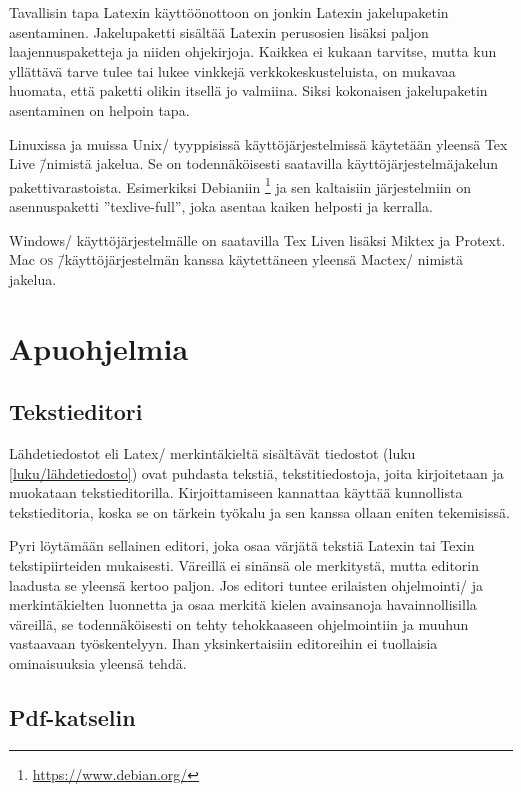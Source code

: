 Tavallisin tapa Latexin käyttöönottoon on jonkin Latexin jakelupaketin
asentaminen. Jakelupaketti sisältää Latexin perusosien lisäksi paljon
laajennuspaketteja ja niiden ohjekirjoja. Kaikkea ei kukaan tarvitse,
mutta kun yllättävä tarve tulee tai lukee vinkkejä verkkokeskusteluista,
on mukavaa huomata, että paketti olikin itsellä jo valmiina. Siksi
kokonaisen jakelupaketin asentaminen on helpoin tapa.

Linuxissa ja muissa Unix\-/ tyyppisissä käyttöjärjestelmissä käytetään
yleensä Tex Live \=/nimistä jakelua. Se on todennäköisesti saatavilla
käyttöjärjestelmäjakelun pakettivarastoista. Esimerkiksi Debianiin%
\footnote{\url{https://www.debian.org/}} ja sen kaltaisiin järjestelmiin
on asennuspaketti ''texlive-full'', joka asentaa kaiken helposti ja
kerralla.

Windows\-/ käyttöjärjestelmälle on saatavilla Tex Liven lisäksi Miktex
ja Protext. Mac \textsc{os} \=/käyttöjärjestelmän kanssa käytettäneen
yleensä Mactex\-/ nimistä jakelua.

\section{Apuohjelmia}

\subsection{Tekstieditori}

Lähdetiedostot eli Latex\-/ merkintäkieltä sisältävät tiedostot (luku
\ref{luku/lähdetiedosto}) ovat puhdasta tekstiä, tekstitiedostoja, joita
kirjoitetaan ja muokataan tekstieditorilla. Kirjoittamiseen kannattaa
käyttää kunnollista tekstieditoria, koska se on tärkein työkalu ja sen
kanssa ollaan eniten tekemisissä.

Pyri löytämään sellainen editori, joka osaa värjätä tekstiä Latexin tai
Texin tekstipiirteiden mukaisesti. Väreillä ei sinänsä ole merkitystä,
mutta editorin laadusta se yleensä kertoo paljon. Jos editori tuntee
erilaisten ohjelmointi\-/{} ja merkintäkielten luonnetta ja osaa merkitä
kielen avainsanoja havainnollisilla väreillä, se todennäköisesti on
tehty tehokkaaseen ohjelmointiin ja muuhun vastaavaan työskentelyyn.
Ihan yksinkertaisiin editoreihin ei tuollaisia ominaisuuksia yleensä
tehdä.

\subsection{Pdf-katselin}

